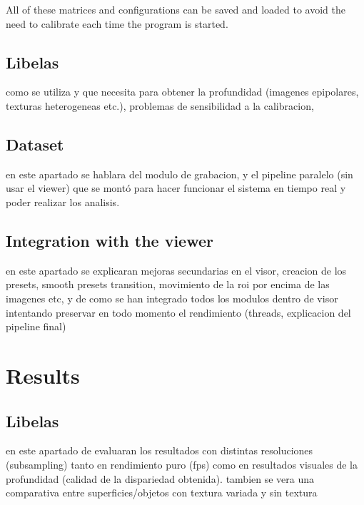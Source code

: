 \documentclass[10pt,a4paper,twocolumn,twoside]{article}
\begin{document}
	All of these matrices and configurations can be saved and loaded to avoid the need to calibrate each time the program is started.  
	
	\subsection{Libelas}
	 como se utiliza y que necesita para obtener la profundidad (imagenes epipolares, texturas heterogeneas etc.), problemas de sensibilidad a la calibracion, 
	
	\subsection{Dataset}
	en este apartado se hablara del modulo de grabacion, y el pipeline paralelo (sin usar el viewer) que se montó para hacer funcionar el sistema en tiempo real y poder realizar los analisis.
	
	\subsection{Integration with the viewer}
	en este apartado se explicaran mejoras secundarias en el visor, creacion de los presets, smooth presets transition, movimiento de la roi por encima de las imagenes etc, y de como se han integrado todos los modulos dentro de visor intentando preservar en todo momento el rendimiento (threads, explicacion del pipeline final)

	
	\section{Results}
	
	
	\subsection{Libelas}
	en este apartado de evaluaran los resultados con distintas resoluciones (subsampling) tanto en rendimiento puro (fps) como en resultados visuales de la profundidad (calidad de la dispariedad obtenida). tambien se vera una comparativa entre superficies/objetos con textura variada y sin textura
	
\end{document}
